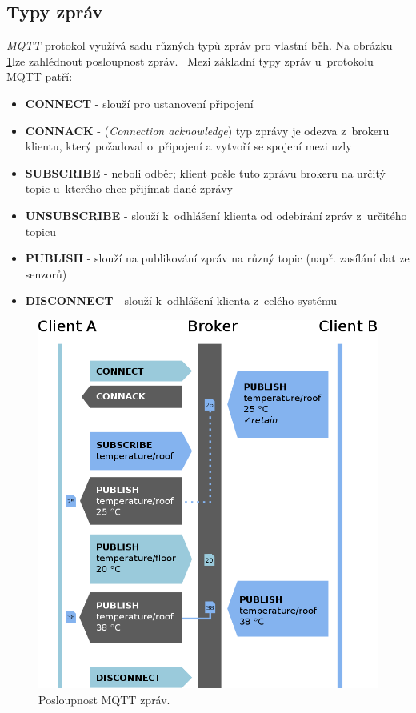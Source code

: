 \subsection*{Typy zpráv}
\emph{MQTT} protokol využívá sadu různých typů zpráv pro vlastní běh. Na obrázku \ref{figure:mqtt_flow}lze zahlédnout posloupnost zpráv.~\cite{wiki:mqtt}
Mezi základní typy zpráv u~protokolu MQTT patří:
\begin{itemize}
  \item \textbf{CONNECT} - slouží pro ustanovení připojení
  \item \textbf{CONNACK} - (\emph{Connection acknowledge}) typ zprávy je odezva z~brokeru klientu, který požadoval o~připojení a vytvoří se spojení mezi uzly
  \item \textbf{SUBSCRIBE} - neboli odběr; klient pošle tuto zprávu brokeru na určitý topic u~kterého chce přijímat dané zprávy
  \item \textbf{UNSUBSCRIBE} - slouží k~odhlášení klienta od odebírání zpráv z~určitého topicu
  \item \textbf{PUBLISH} - slouží na publikování zpráv na různý topic (např. zasílání dat ze senzorů)
  \item \textbf{DISCONNECT} - slouží k~odhlášení klienta z~celého systému
\end{itemize}

\begin{figure}[ht]
  \centering
  \includegraphics[width=.7 \linewidth]{obrazky-figures/mqtt_flow.png}
  \caption{Posloupnost MQTT zpráv.~\cite{wiki:mqtt}}
  \label{figure:mqtt_flow}
\end{figure}

